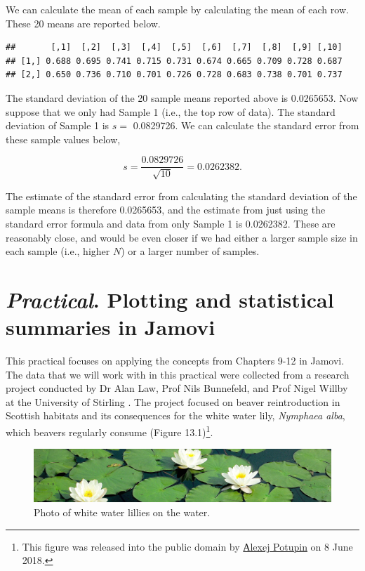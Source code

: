 \documentclass[
]{scrbook}
\begin{document}
We can calculate the mean of each sample by calculating the mean of each row.
These 20 means are reported below.

\begin{verbatim}
##       [,1]  [,2]  [,3]  [,4]  [,5]  [,6]  [,7]  [,8]  [,9] [,10]
## [1,] 0.688 0.695 0.741 0.715 0.731 0.674 0.665 0.709 0.728 0.687
## [2,] 0.650 0.736 0.710 0.701 0.726 0.728 0.683 0.738 0.701 0.737
\end{verbatim}

The standard deviation of the 20 sample means reported above is 0.0265653.
Now suppose that we only had Sample 1 (i.e., the top row of data).
The standard deviation of Sample 1 is \(s =\) 0.0829726.
We can calculate the standard error from these sample values below,

\[s = \frac{0.0829726}{\sqrt{10}} = 0.0262382.\]

The estimate of the standard error from calculating the standard deviation of the sample means is therefore 0.0265653, and the estimate from just using the standard error formula and data from only Sample 1 is 0.0262382.
These are reasonably close, and would be even closer if we had either a larger sample size in each sample (i.e., higher \(N\)) or a larger number of samples.

\hypertarget{Chapter_13}{%
\chapter{\texorpdfstring{\emph{Practical}. Plotting and statistical summaries in Jamovi}{Practical. Plotting and statistical summaries in Jamovi}}\label{Chapter_13}}

This practical focuses on applying the concepts from Chapters 9-12 in Jamovi.
The data that we will work with in this practical were collected from a research project conducted by Dr Alan Law, Prof Nils Bunnefeld, and Prof Nigel Willby at the University of Stirling \citep{Law2014}.
The project focused on beaver reintroduction in Scottish habitats and its consequences for the white water lily, \emph{Nymphaea alba}, which beavers regularly consume (Figure 13.1)\footnote{This figure was released into the public domain by \href{https://commons.wikimedia.org/wiki/File:Nymphaea_alba._Reader.jpg}{Аlexej Potupin} on 8 June 2018.}.

\begin{figure}
\includegraphics[width=1\linewidth]{img/Nymphaea_alba_pads} \caption{Photo of white water lillies on the water.}\label{fig:unnamed-chunk-46}
\end{figure}
\end{document}
